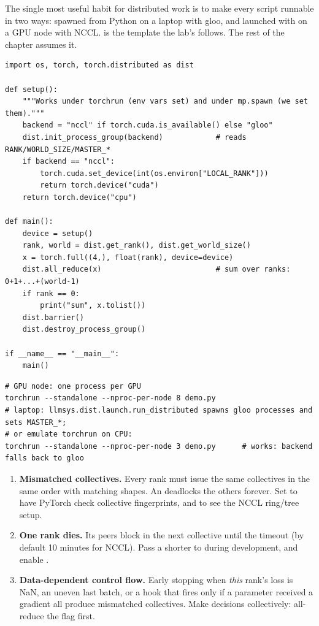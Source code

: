 The single most useful habit for distributed work is to make every script runnable in two ways:
spawned from Python on a laptop with gloo, and launched with  on a GPU node with
NCCL.  is the template the lab's  follows. The rest
of the chapter assumes it.

\begin{lstlisting}[caption={A launcher-agnostic distributed entry point.},label={lst:sharding:template}]
import os, torch, torch.distributed as dist

def setup():
    """Works under torchrun (env vars set) and under mp.spawn (we set them)."""
    backend = "nccl" if torch.cuda.is_available() else "gloo"
    dist.init_process_group(backend)            # reads RANK/WORLD_SIZE/MASTER_*
    if backend == "nccl":
        torch.cuda.set_device(int(os.environ["LOCAL_RANK"]))
        return torch.device("cuda")
    return torch.device("cpu")

def main():
    device = setup()
    rank, world = dist.get_rank(), dist.get_world_size()
    x = torch.full((4,), float(rank), device=device)
    dist.all_reduce(x)                          # sum over ranks: 0+1+...+(world-1)
    if rank == 0:
        print("sum", x.tolist())
    dist.barrier()
    dist.destroy_process_group()

if __name__ == "__main__":
    main()
\end{lstlisting}

\begin{lstlisting}[style=shell]
# GPU node: one process per GPU
torchrun --standalone --nproc-per-node 8 demo.py
# laptop: llmsys.dist.launch.run_distributed spawns gloo processes and sets MASTER_*;
# or emulate torchrun on CPU:
torchrun --standalone --nproc-per-node 3 demo.py      # works: backend falls back to gloo
\end{lstlisting}

\begin{pitfall}
\begin{enumerate}
  \item \textbf{Mismatched collectives.} Every rank must issue the same collectives in the same
    order with matching shapes. An  deadlocks the
    others forever. Set  to have PyTorch check collective
    fingerprints, and  to see the NCCL ring/tree setup.
  \item \textbf{One rank dies.} Its peers block in the next collective until the timeout (by default
    10 minutes for NCCL). Pass a shorter  to  during
    development, and enable .
  \item \textbf{Data-dependent control flow.} Early stopping when \emph{this} rank's loss is
    NaN, an uneven last batch, or a hook that fires only if a parameter received a gradient all
    produce mismatched collectives. Make decisions collectively: all-reduce the flag first.
\end{enumerate}
\end{pitfall}

